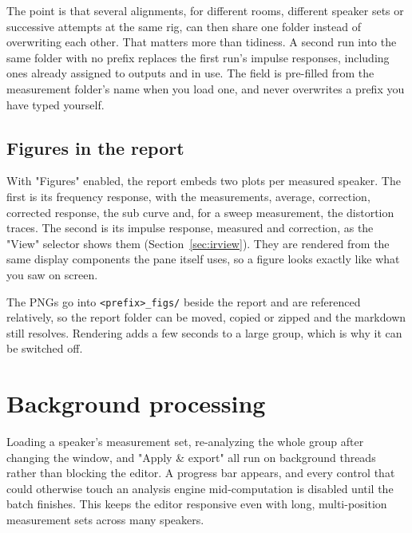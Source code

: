 The point is that several alignments, for different rooms, different speaker sets or successive attempts at the same rig, can then share one folder instead of overwriting each other. That matters more than tidiness. A second run into the same folder with no prefix replaces the first run's impulse responses, including ones already assigned to outputs and in use. The field is pre-filled from the measurement folder's name when you load one, and never overwrites a prefix you have typed yourself.

\subsection{Figures in the report}\label{sec:groupfigures}
With "Figures" enabled, the report embeds two plots per measured speaker. The first is its frequency response, with the measurements, average, correction, corrected response, the sub curve and, for a sweep measurement, the distortion traces. The second is its impulse response, measured and correction, as the "View" selector shows them (Section~\ref{sec:irview}). They are rendered from the same display components the pane itself uses, so a figure looks exactly like what you saw on screen.

The PNGs go into \texttt{<prefix>\_figs/} beside the report and are referenced relatively, so the report folder can be moved, copied or zipped and the markdown still resolves. Rendering adds a few seconds to a large group, which is why it can be switched off.

\section{Background processing}
Loading a speaker's measurement set, re-analyzing the whole group after changing the  window, and "Apply \& export" all run on background threads rather than blocking the editor. A progress bar appears, and every control that could otherwise touch an analysis engine mid-computation is disabled until the batch finishes. This keeps the editor responsive even with long, multi-position measurement sets across many speakers.
